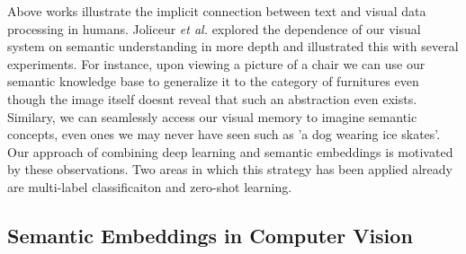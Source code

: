 \documentclass[12pt]{report}
\begin{document}
Above works illustrate the implicit connection between text and visual data processing in humans. Joliceur \textit{et al.} \cite{Joliceur1984} explored the dependence of our visual system on semantic understanding in more depth and illustrated this with several experiments. For instance, upon viewing a picture of a chair we can use our semantic knowledge base to generalize it to the category of furnitures even though the image itself doesnt reveal that such an abstraction even exists. Similary, we can seamlessly access our visual memory to imagine semantic concepts, even ones we may never have seen such as 'a dog wearing ice skates'. Our approach of combining deep learning and semantic embeddings is motivated by these observations. Two areas in which this strategy has been applied already are multi-label classificaiton and zero-shot learning.

\subsection{Semantic Embeddings in Computer Vision}








\end{document}
